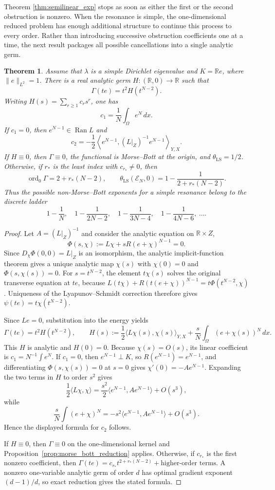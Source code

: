 \documentclass[11pt]{article}
\newtheorem{theorem}{Theorem}[section]
\theoremstyle{definition}
\theoremstyle{remark}
\begin{document}
Theorem \ref{thm:semilinear_exp} stops as soon as either the first or the second obstruction is nonzero. When the resonance is simple, the one-dimensional reduced problem has enough additional structure to continue this process to every order. Rather than introducing successive obstruction coefficients one at a time, the next result packages all possible cancellations into a single analytic germ.

\begin{theorem}\label{thm:obstruction-ladder}
Assume that $\lambda$ is a simple Dirichlet eigenvalue and $K=\mathbb Re$, where $\|e\|_{L^2}=1$. There is a real analytic germ $H:(\mathbb R,0)\to\mathbb R$ such that
$$
\Gamma(te)=t^2H(t^{N-2}).
$$
Writing $H(s)=\sum_{r\ge1}c_rs^r$, one has
$$
c_1=\frac1N\int_\Omega e^N\,dx.
$$
If $c_1=0$, then $e^{N-1}\in\operatorname{Ran}L$ and
$$
c_2=-\frac12
\left\langle e^{N-1},(L|_Z)^{-1}e^{N-1}\right\rangle_{Y,X}.
$$
If $H\equiv0$, then $\Gamma\equiv0$, the functional is Morse--Bott at the origin, and $\theta_{\mathrm{LS}}=1/2$. Otherwise, if $r_*$ is the least index with $c_{r_*}\ne0$, then
$$
\operatorname{ord}_0\Gamma=2+r_*(N-2),
\qquad
\theta_{\mathrm{LS}}(\mathcal E_N,0)
=1-\frac{1}{2+r_*(N-2)}.
$$
Thus the possible non-Morse--Bott exponents for a simple resonance belong to the discrete ladder
$$
1-\frac1N,\quad
1-\frac1{2N-2},\quad
1-\frac1{3N-4},\quad
1-\frac1{4N-6},\ \ldots .
$$
\end{theorem}

\begin{proof}
Let $A=(L|_Z)^{-1}$ and consider the analytic equation on $\mathbb R\times Z$,
$$
\Phi(s,\chi):=L\chi+sR(e+\chi)^{N-1}=0.
$$
Since $D_\chi\Phi(0,0)=L|_Z$ is an isomorphism, the analytic implicit-function theorem gives a unique analytic map $\chi(s)$ with $\chi(0)=0$ and $\Phi(s,\chi(s))=0$. For $s=t^{N-2}$, the element $t\chi(s)$ solves the original transverse equation at $te$, because
$L(t\chi)+R(t(e+\chi))^{N-1}=t\Phi(t^{N-2},\chi)$. Uniqueness of the Lyapunov--Schmidt correction therefore gives
$\psi(te)=t\chi(t^{N-2})$.

Since $L e=0$, substitution into the energy yields
$$
\Gamma(te)=t^2H(t^{N-2}),
\qquad
H(s):=\frac12\langle L\chi(s),\chi(s)\rangle_{Y,X}
+\frac{s}{N}\int_\Omega(e+\chi(s))^N\,dx.
$$
This $H$ is analytic and $H(0)=0$. Because $\chi(s)=O(s)$, its linear coefficient is $c_1=N^{-1}\int e^N$. If $c_1=0$, then $e^{N-1}\perp K$, so $R(e^{N-1})=e^{N-1}$, and differentiating $\Phi(s,\chi(s))=0$ at $s=0$ gives $\chi'(0)=-Ae^{N-1}$. Expanding the two terms in $H$ to order $s^2$ gives
$$
\frac12\langle L\chi,\chi\rangle
=\frac{s^2}{2}\langle e^{N-1},Ae^{N-1}\rangle+O(s^3),
$$
while
$$
\frac{s}{N}\int(e+\chi)^N
=-s^2\langle e^{N-1},Ae^{N-1}\rangle+O(s^3).
$$
Hence the displayed formula for $c_2$ follows.

If $H\equiv0$, then $\Gamma\equiv0$ on the one-dimensional kernel and Proposition~\ref{prop:morse_bott_reduction} applies. Otherwise, if $c_{r_*}$ is the first nonzero coefficient, then
$\Gamma(te)=c_{r_*}t^{2+r_*(N-2)}+\text{higher-order terms}$. A nonzero one-variable analytic germ of order $d$ has optimal gradient exponent $(d-1)/d$, so exact reduction gives the stated formula.
\end{proof}
\end{document}
